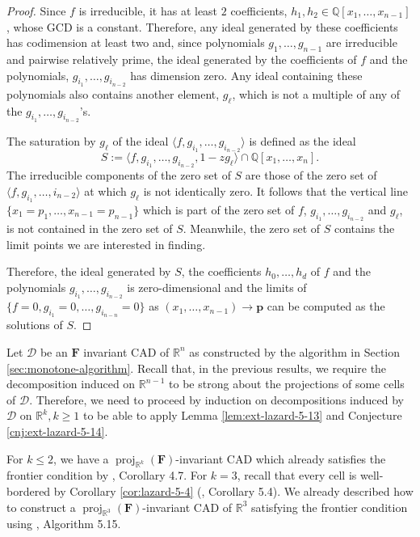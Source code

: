 \documentclass[
]{book}
\theoremstyle{definition}
\theoremstyle{definition}
\theoremstyle{definition}
\theoremstyle{definition}
\theoremstyle{remark}
\begin{document}
\begin{proof}
Since \(f\) is irreducible, it has at least \(2\) coefficients, \(h_1,h_2 \in \mathbb{Q}[x_1,\ldots,x_{n-1}]\), whose GCD is a constant.
Therefore, any ideal generated by these coefficients has codimension at least two and, since polynomials \(g_1,\ldots,g_{n-1}\) are irreducible and pairwise relatively prime, the ideal generated by the coefficients of \(f\) and the polynomials, \(g_{i_1},\ldots,g_{i_{n-2}}\) has dimension zero.
Any ideal containing these polynomials also contains another element, \(g_\ell\), which is not a multiple of any of the \(g_{i_1},\ldots,g_{i_{n-2}}\)'s.

The saturation by \(g_\ell\) of the ideal \(\langle f, g_{i_1}, \ldots, g_{i_{n-2}} \rangle\) is defined as the ideal
\[
S := \langle f, g_{i_1}, \ldots, g_{i_{n-2}}, 1 - z g_\ell \rangle \cap \mathbb{Q}[x_1,\ldots,x_n].
\]
The irreducible components of the zero set of \(S\) are those of the zero set of \(\langle f,g_{i_1},\ldots,i_{n-2} \rangle\) at which \(g_\ell\) is not identically zero. It follows that the vertical line \(\{ x_1 = p_1, \ldots, x_{n-1} = p_{n-1} \}\) which is part of the zero set of \(f\),
\(g_{i_1},\ldots,g_{i_{n-2}}\) and \(g_\ell\), is not contained in the zero set of \(S\).
Meanwhile, the zero set of \(S\) contains the limit points we are interested in finding.

Therefore, the ideal generated by \(S\), the coefficients \(h_0,\ldots,h_d\) of \(f\) and the polynomials \(g_{i_1},\ldots,g_{i_{n-2}}\) is zero-dimensional and the limits of \(\{ f = 0, g_{i_1} = 0, \ldots, g_{i_{n-n}} = 0 \}\) as \((x_1,\ldots,x_{n-1}) \to \mathbf{p}\) can be computed as the solutions of \(S\).
\end{proof}

Let \(\mathcal{D}\) be an \(\mathbf{F}\) invariant CAD of \(\mathbb{R}^n\) as constructed by the algorithm in Section \ref{sec:monotone-algorithm}.
Recall that, in the previous results, we require the decomposition induced on \(\mathbb{R}^{n-1}\) to be strong about the projections of some cells of \(\mathcal{D}\). Therefore, we need to proceed by induction on decompositions induced by \(\mathcal{D}\) on \(\mathbb{R}^k, k \ge 1\) to be able to apply Lemma \ref{lem:ext-lazard-5-13} and Conjecture \ref{cnj:ext-lazard-5-14}.

For \(k\le 2\), we have a \({\operatorname{proj}_{\mathbb{R}^{k}}}(\mathbf{F})\)-invariant CAD which already satisfies the frontier condition by \citet{lazard10}, Corollary 4.7.
For \(k=3\), recall that every cell is well-bordered by Corollary \ref{cor:lazard-5-4} (\citet{lazard10}, Corollary 5.4). We already described how to construct a \({\operatorname{proj}_{\mathbb{R}^{3}}}(\mathbf{F})\)-invariant CAD of \(\mathbb{R}^3\) satisfying the frontier condition using \citet{lazard10}, Algorithm 5.15.
\end{document}
